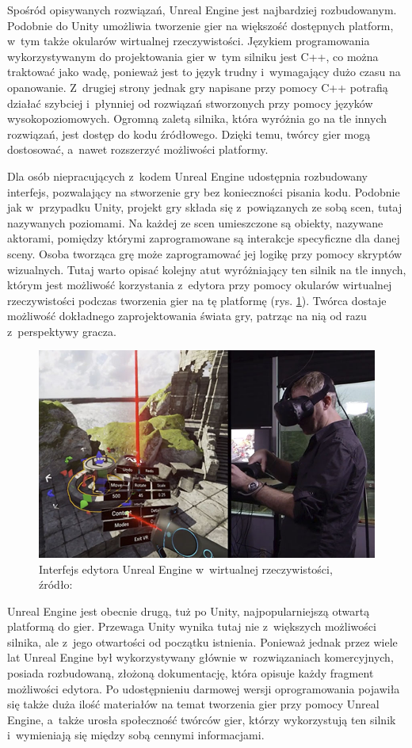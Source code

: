 Spośród opisywanych rozwiązań, Unreal Engine jest najbardziej rozbudowanym. Podobnie do Unity umożliwia tworzenie gier na większość dostępnych platform, w~tym także okularów wirtualnej rzeczywistości. Językiem programowania wykorzystywanym do projektowania gier w~tym silniku jest C++, co można traktować jako wadę, ponieważ jest to język trudny i~wymagający dużo czasu na opanowanie. Z~drugiej strony jednak gry napisane przy pomocy C++ potrafią działać szybciej i~płynniej od rozwiązań stworzonych przy pomocy języków wysokopoziomowych. Ogromną zaletą silnika, która wyróżnia go na tle innych rozwiązań, jest dostęp do kodu źródłowego. Dzięki temu, twórcy gier mogą dostosować, a~nawet rozszerzyć możliwości platformy. 

Dla osób niepracujących z~kodem Unreal Engine udostępnia rozbudowany interfejs, pozwalający na stworzenie gry bez konieczności pisania kodu. Podobnie jak w~przypadku Unity, projekt gry składa się z~powiązanych ze sobą scen, tutaj nazywanych poziomami. Na każdej ze scen umieszczone są obiekty, nazywane aktorami, pomiędzy którymi zaprogramowane są interakcje specyficzne dla danej sceny. Osoba tworząca grę może zaprogramować jej logikę przy pomocy skryptów wizualnych. Tutaj warto opisać kolejny atut wyróżniający ten silnik na tle innych, którym jest możliwość korzystania z~edytora przy pomocy okularów wirtualnej rzeczywistości podczas tworzenia gier na tę platformę (rys. \ref{fig:unreal_vr_editor}). Twórca dostaje możliwość dokładnego zaprojektowania świata gry, patrząc na nią od razu z~perspektywy gracza. 

\begin{figure}
	\centering
	\includegraphics[width=0.7\linewidth]{images/unreal_vr_editor.jpg}
	\caption{Interfejs edytora Unreal Engine w~wirtualnej rzeczywistości, źródło:~\cite{unreal_manual}}
	\label{fig:unreal_vr_editor}
\end{figure}

Unreal Engine jest obecnie drugą, tuż po Unity, najpopularniejszą otwartą platformą do gier. Przewaga Unity wynika tutaj nie z~większych możliwości silnika, ale z~jego otwartości od początku istnienia. Ponieważ jednak przez wiele lat Unreal Engine był wykorzystywany głównie w~rozwiązaniach komercyjnych, posiada rozbudowaną, złożoną dokumentację, która opisuje każdy fragment możliwości edytora. Po udostępnieniu darmowej wersji oprogramowania pojawiła się także duża ilość materiałów na temat tworzenia gier przy pomocy Unreal Engine, a~także urosła społeczność twórców gier, którzy wykorzystują ten silnik i~wymieniają się między sobą cennymi informacjami. 
